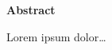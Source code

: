 \thispagestyle{plain}
\begin{center}
    \vspace{0.9cm}
    \textbf{Abstract}
\end{center}

Lorem ipsum dolor\ldots